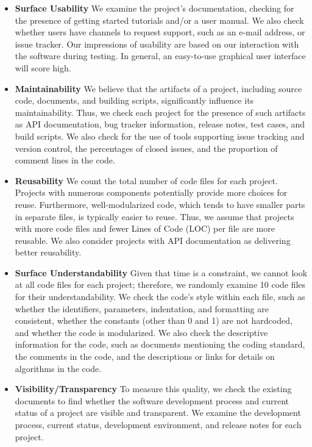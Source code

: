 \documentclass[11pt]{article}
\begin{document}
\begin{itemize}
\item \textbf{Surface Usability} We examine the project's documentation,
checking for the presence of getting started tutorials and/or a user manual. We
also check whether users have channels to request support, such as an e-mail
address, or issue tracker. Our impressions of usability are based on our
interaction with the software during testing.  In general, an easy-to-use
graphical user interface will score high.

\item \textbf{Maintainability} We believe that the artifacts of a project,
including source code, documents, and building scripts, significantly influence
its maintainability. Thus, we check each project for the presence of such
artifacts as API documentation, bug tracker information, release notes, test
cases, and build scripts. We also check for the use of tools supporting issue
tracking and version control, the percentages of closed issues, and the
proportion of comment lines in the code.

\item \textbf{Reusability} We count the total number of code files for each
project. Projects with numerous components potentially provide more choices for
reuse. Furthermore, well-modularized code, which tends to have smaller parts in
separate files, is typically easier to reuse. Thus, we assume that projects with
more code files and fewer Lines of Code (LOC) per file are more reusable. We also
consider projects with API documentation as delivering better reusability.

\item \textbf{Surface Understandability} Given that time is a constraint, we
cannot look at all code files for each project; therefore, we randomly examine
10 code files for their understandability. We check the code's style within each
file, such as whether the identifiers, parameters, indentation, and formatting
are consistent, whether the constants (other than 0 and 1) are not hardcoded, and
whether the code is modularized. We also check the descriptive information for
the code, such as documents mentioning the coding standard, the comments in the
code, and the descriptions or links for details on algorithms in the code. 

\item \textbf{Visibility/Transparency} To measure this quality, we check the
existing documents to find whether the software development process and
current status of a project are visible and transparent. We examine the
development process, current status, development environment, and release notes
for each project.
\end{itemize}
\end{document}
